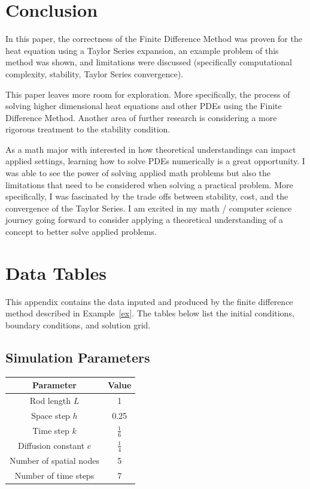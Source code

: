 \documentclass[12pt,letterpaper,reqno]{amsart}
\theoremstyle{definition}
\numberwithin{thm}{section}
\theoremstyle{remark}
\begin{document}
\section{Conclusion}
In this paper, the correctness of the Finite Difference Method was proven for the heat equation using a Taylor Series expansion, an example problem of this method was shown, and limitations were discussed (specifically computational complexity, stability, Taylor Series convergence).

This paper leaves more room for exploration. More specifically, the process of solving higher dimensional heat equations and other PDEs using the Finite Difference Method. Another area of further research is considering a more rigorous treatment to the stability condition. 

As a math major with interested in how theoretical understandings can impact applied settings, learning how to solve PDEs numerically is a great opportunity. I was able to see the power of solving applied math problems but also the limitations that need to be considered when solving a practical problem. More specifically, I was fascinated by the trade offs between stability, cost, and the convergence of the Taylor Series. I am excited in my math / computer science journey going forward to consider applying a theoretical understanding of a concept to better solve applied problems.  


\printbibliography


\appendix

\section{Data Tables}

This appendix contains the data inputed and produced by the finite difference method described in Example~\ref{ex}. The tables below list the initial conditions, boundary conditions, and solution grid.

\subsection{Simulation Parameters}

\begin{center}
\begin{tabular}{|c|c|}
\hline
Parameter & Value \\
\hline
Rod length $L$ & 1 \\
Space step $h$ & 0.25 \\
Time step $k$ & $\frac{1}{6}$ \\
Diffusion constant $c$ & $\frac{1}{4}$ \\
Number of spatial nodes & 5 \\
Number of time steps & 7 \\
\hline
\end{tabular}
\end{center}
\end{document}
